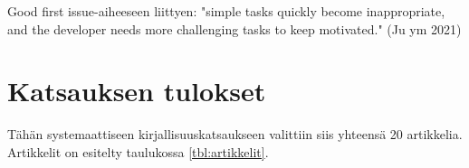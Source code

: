 \documentclass[utf8]{gradu3}
\begin{document}

Good first issue-aiheeseen liittyen: "simple tasks quickly become inappropriate, and the developer needs more challenging tasks to keep motivated." (Ju ym 2021)


\chapter{Katsauksen tulokset}

Tähän systemaattiseen kirjallisuuskatsaukseen valittiin siis yhteensä 20 artikkelia. Artikkelit on esitelty taulukossa \ref{tbl:artikkelit}. 
\end{document}
